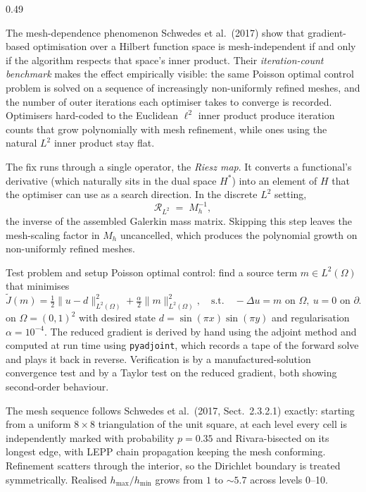 \documentclass[final]{beamer}
\newcommand{\Om}{\Omega}
\newcommand{\Lp}[1]{L^{2}(#1)}
\newcommand{\Rmap}{\mathcal{R}}
\newcommand{\Jt}{\tilde{J}}
\begin{document}
\begin{frame}[t]
\begin{columns}[t,totalwidth=\dimexpr\paperwidth-3cm\relax]
\begin{column}{0.49\dimexpr\paperwidth-3cm\relax}
\begin{block}{The mesh-dependence phenomenon}
Schwedes et al.\ (2017) show that gradient-based optimisation over a Hilbert function space is mesh-independent if and only if the algorithm respects that space's inner product. Their \emph{iteration-count benchmark} makes the effect empirically visible: the same Poisson optimal control problem is solved on a sequence of increasingly non-uniformly refined meshes, and the number of outer iterations each optimiser takes to converge is recorded. Optimisers hard-coded to the Euclidean $\ell^{2}$ inner product produce iteration counts that grow polynomially with mesh refinement, while ones using the natural $L^{2}$ inner product stay flat.

The fix runs through a single operator, the \emph{Riesz map}. It converts a functional's derivative (which naturally sits in the dual space $H^{*}$) into an element of $H$ that the optimiser can use as a search direction. In the discrete $L^{2}$ setting,
\[
\Rmap_{L^{2}} \;=\; M_{h}^{-1},
\]
the inverse of the assembled Galerkin mass matrix. Skipping this step leaves the mesh-scaling factor in $M_{h}$ uncancelled, which produces the polynomial growth on non-uniformly refined meshes.
\end{block}

\begin{block}{Test problem and setup}
Poisson optimal control: find a source term $m \in \Lp{\Om}$ that minimises
\[
\Jt(m) = \tfrac{1}{2}\|u-d\|_{\Lp{\Om}}^{2} + \tfrac{\alpha}{2}\|m\|_{\Lp{\Om}}^{2},
\quad
\text{s.t.} \quad -\Delta u = m \text{ on } \Om,\ u = 0 \text{ on } \partial\Om,
\]
on $\Om = (0,1)^{2}$ with desired state $d = \sin(\pi x)\sin(\pi y)$ and regularisation $\alpha = 10^{-4}$. The reduced gradient is derived by hand using the adjoint method and computed at run time using \texttt{pyadjoint}, which records a tape of the forward solve and plays it back in reverse. Verification is by a manufactured-solution convergence test and by a Taylor test on the reduced gradient, both showing second-order behaviour.

The mesh sequence follows Schwedes et al.\ (2017, Sect.~2.3.2.1) exactly: starting from a uniform $8\times 8$ triangulation of the unit square, at each level every cell is independently marked with probability $p = 0.35$ and Rivara-bisected on its longest edge, with LEPP chain propagation keeping the mesh conforming. Refinement scatters through the interior, so the Dirichlet boundary is treated symmetrically. Realised $h_{\max}/h_{\min}$ grows from $1$ to $\sim 5.7$ across levels 0--10.


\end{block}
\end{column}
\end{columns}
\end{frame}
\end{document}
